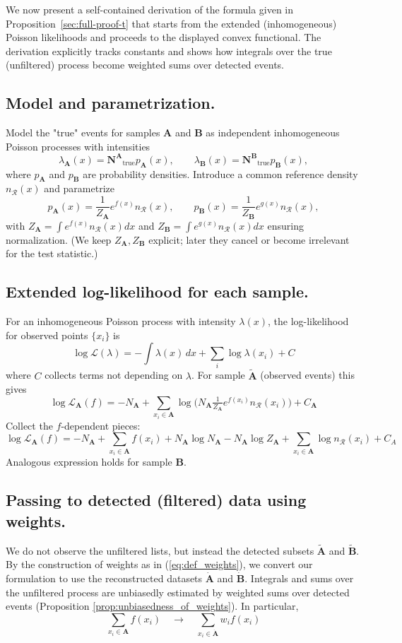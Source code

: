 \documentclass{article}
\newcommand{\dataset}[1]{{\mathbf{#1}}}         %
\newcommand{\true}[1]{{\dataset{#1}}_{\text{true}}}  %
\newcommand{\meas}[1]{{\dataset{\tilde{#1}}}}   %
\newcommand{\reco}[1]{{\dataset{\dot{#1}}}}     %
\newcommand{\refdist}[1][x]{n_{\mathcal{R}}({#1})}  %
\newcommand{\llikelihood}{\log\mathcal{L}}      %
\begin{document}

We now present a self-contained derivation of the formula given in Proposition~\ref{sec:full-proof-t} that starts from the extended (inhomogeneous) Poisson likelihoods and proceeds to the displayed convex functional. The derivation explicitly tracks constants and shows how integrals over the true (unfiltered) process become weighted sums over detected events.

\subsection{Model and parametrization.}
Model the "true" events for samples $\dataset{A}$ and $\dataset{B}$ as independent inhomogeneous Poisson processes with intensities
\[
\lambda_{\dataset{A}}(x)=\true{N^{\dataset{A}}} p_{\dataset{A}}(x),\qquad
\lambda_{\dataset{B}}(x)=\true{N^{\dataset{B}}} p_{\dataset{B}}(x),
\]
where \(p_{\dataset{A}}\) and \(p_{\dataset{B}}\) are probability densities. Introduce a common reference density \(n_{\mathcal{R}}(x)\) and parametrize
\[
p_{\dataset{A}}(x)=\frac{1}{Z_\dataset{A}} e^{f(x)} \refdist,\qquad
p_{\dataset{B}}(x)=\frac{1}{Z_\dataset{B}} e^{g(x)} \refdist,
\]
with
\(Z_\dataset{A}=\int e^{f(x)} \refdist dx\) and \(Z_\dataset{B}=\int e^{g(x)} \refdist dx\) ensuring normalization. (We keep \(Z_\dataset{A},Z_\dataset{B}\) explicit; later they cancel or become irrelevant for the test statistic.)

\subsection{Extended log-likelihood for each sample.}
For an inhomogeneous Poisson process with intensity \(\lambda(x)\), the log-likelihood for observed points \(\{x_i\}\) is
\[
\llikelihood(\lambda) = -\int \lambda(x)\,dx + \sum_i \log\lambda(x_i) + C
\]
where \(C\) collects terms not depending on \(\lambda\). For sample $\meas{A}$ (observed events) this gives
\[
\llikelihood_{\dataset{A}}(f) = -{N}_{\dataset{A}} + \sum_{x_i \in \dataset{A}} \log\big({N}_{\dataset{A}}\tfrac{1}{Z_\dataset{A}} e^{f(x_i)} \refdist[x_i]\big) + C_\dataset{A}
\]
Collect the \(f\)-dependent pieces:
\[
\llikelihood_{\dataset{A}}(f) = -N_{\dataset{A}} + \sum_{x_i \in \dataset{A}} f(x_i) + N_{\dataset{A}}\log{N_{\dataset{A}}} - N_{\dataset{A}}\log Z_\dataset{A} + \sum_{x_i \in \dataset{A}} \log \refdist[x_i] + C_A
\]
Analogous expression holds for sample $\dataset{B}$.

\subsection{Passing to detected (filtered) data using weights.}
We do not observe the unfiltered lists, but instead the detected subsets \(\meas{A}\) and \(\meas{B}\). By the construction of weights as in (\ref{eq:def_weights}), we convert our formulation to use the reconstructed datasets \(\reco{A}\) and \(\reco{B}\). Integrals and sums over the unfiltered process are unbiasedly estimated by weighted sums over detected events (Proposition \ref{prop:unbiasedness_of_weights}). In particular,
\[
\sum_{x_i \in \dataset{A}} f(x_i) \quad\longrightarrow\quad \sum_{x_i \in \reco{A}} w_i f(x_i)
\]
\end{document}
